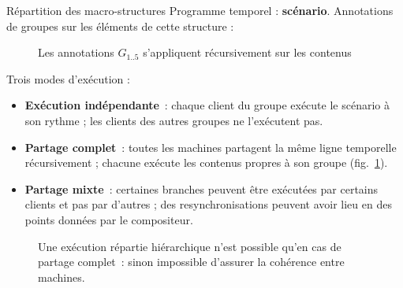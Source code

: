\begin{block}{Répartition des macro-structures}
	Programme temporel : \textbf{scénario}. 
	Annotations de groupes sur les éléments de cette structure : 
    
    \begin{figure}
        \begin{tikzpicture}[scale=4]
        
        \end{tikzpicture}
        \caption{Les annotations $G_{1..5}$ s'appliquent récursivement sur les contenus}
    \end{figure}

	Trois modes d'exécution : 
	\begin{itemize}
		\item \textbf{Exécution indépendante}~: chaque client du groupe exécute le scénario à son rythme ; les clients des autres groupes ne l'exécutent pas.
		\item \textbf{Partage complet}~: toutes les machines partagent la même ligne temporelle récursivement ; chacune exécute les contenus propres à son groupe (fig.~\ref{fig.reparti}).
		\item \textbf{Partage mixte}~: certaines branches peuvent être exécutées par certains clients et pas par d'autres ; des resynchronisations peuvent avoir lieu en des points données par le compositeur.
	\end{itemize}
    
    \begin{figure} 
    	\centering
    	\begin{tikzpicture}[scale=4]
            
        \end{tikzpicture}
        \caption{Une exécution répartie hiérarchique n'est possible qu'en cas de partage complet~: sinon impossible d'assurer la cohérence entre machines.}
        \label{fig.reparti}
    \end{figure}
    
\end{block}